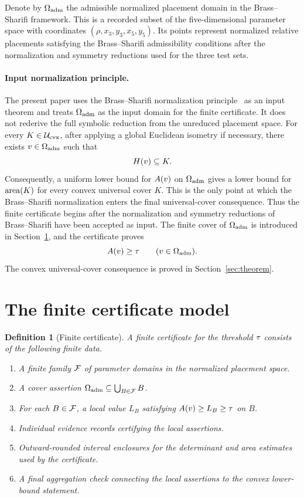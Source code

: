 \documentclass[11pt]{article}
\newtheorem{definition}{Definition}
\begin{document}
Denote by \(\Omega_{\mathrm{adm}}\) the admissible normalized placement domain in the Brass--Sharifi framework.  This is a recorded subset of the five-dimensional parameter space with coordinates \((\rho,x_3,y_3,x_5,y_5)\).  Its points represent normalized relative placements satisfying the Brass--Sharifi admissibility conditions after the normalization and symmetry reductions used for the three test sets.

\paragraph{Input normalization principle.}
The present paper uses the Brass--Sharifi normalization principle~\cite{brass-sharifi} as an input theorem and treats \(\Omega_{\mathrm{adm}}\) as the input domain for the finite certificate.  It does not rederive the full symbolic reduction from the unreduced placement space.  For every \(K\in\mathcal{U}_{\mathrm{cvx}}\), after applying a global Euclidean isometry if necessary, there exists \(v\in\Omega_{\mathrm{adm}}\) such that
\[
H(v)\subseteq K.
\]
Consequently, a uniform lower bound for \(A(v)\) on \(\Omega_{\mathrm{adm}}\) gives a lower bound for \(\operatorname{area}(K)\) for every convex universal cover \(K\).  This is the only point at which the Brass--Sharifi normalization enters the final universal-cover consequence.  Thus the finite certificate begins after the normalization and symmetry reductions of Brass--Sharifi have been accepted as input.  The finite cover of \(\Omega_{\mathrm{adm}}\) is introduced in Section~\ref{sec:certificate-model}, and the certificate proves
\[
A(v)\ge\tau\qquad(v\in\Omega_{\mathrm{adm}}).
\]
The convex universal-cover consequence is proved in Section~\ref{sec:theorem}.

\section{The finite certificate model}\label{sec:certificate-model}

\begin{definition}[Finite certificate]
A finite certificate for the threshold \(\tau\) consists of the following finite data.
\begin{enumerate}
\item A finite family \(\mathcal{F}\) of parameter domains in the normalized placement space.
\item A cover assertion \(\Omega_{\mathrm{adm}}\subseteq\bigcup_{B\in\mathcal{F}}B\).
\item For each \(B\in\mathcal{F}\), a local value \(L_B\) satisfying \(A(v)\ge L_B\ge\tau\) on \(B\).
\item Individual evidence records certifying the local assertions.
\item Outward-rounded interval enclosures for the determinant and area estimates used by the certificate.
\item A final aggregation check connecting the local assertions to the convex lower-bound statement.
\end{enumerate}
\end{definition}
\end{document}
